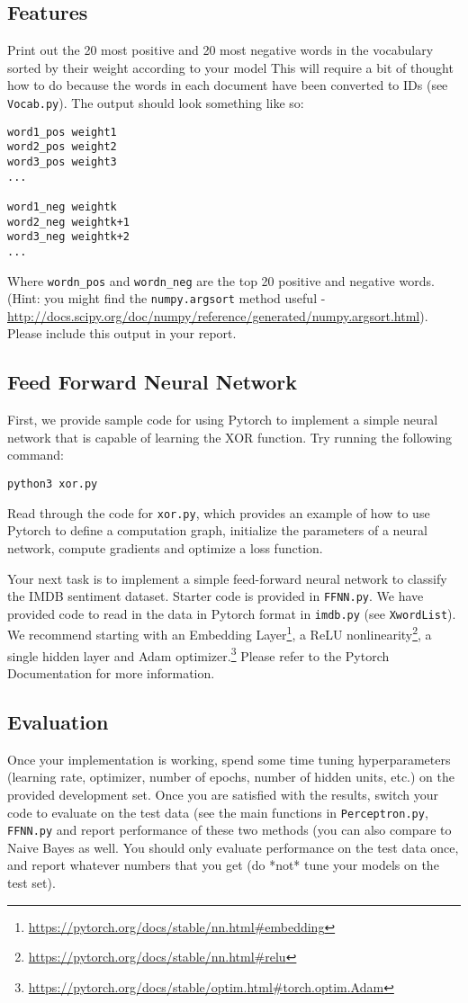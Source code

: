 \documentclass[12pt, letterpaper]{article}
\begin{document}
\subsection*{Features}
Print out the 20 most positive and 20 most negative words in
the vocabulary sorted by their weight according to your model
This will require a bit of thought how to do because the words in each document 
have been converted to IDs (see {\tt Vocab.py}).  The output should look something like so:
\begin{verbatim}
word1_pos weight1
word2_pos weight2
word3_pos weight3
...

word1_neg weightk
word2_neg weightk+1
word3_neg weightk+2
...
\end{verbatim}
Where {\tt wordn\_pos} and {\tt wordn\_neg} are the top 20 positive and negative words.  (Hint: you might find the {\tt numpy.argsort} method
useful - \url{http://docs.scipy.org/doc/numpy/reference/generated/numpy.argsort.html}).  Please include this output in your report.

\subsection*{Feed Forward Neural Network}
First, we provide sample code for using Pytorch to implement a simple neural network that is capable of learning the XOR function.  Try running the following command:
\begin{Verbatim}[xleftmargin=.5in]
python3 xor.py
\end{Verbatim}
Read through the code for {\tt xor.py}, which provides an example of how to use Pytorch to define a computation graph, initialize the parameters of a neural network, compute gradients and optimize a loss function.

Your next task is to implement a simple feed-forward neural network to classify the IMDB sentiment dataset.  Starter code is provided in {\tt FFNN.py}.  We have provided code to read in the data in Pytorch format in {\tt imdb.py} (see {\tt XwordList}).
We recommend starting with an Embedding Layer\footnote{\url{https://pytorch.org/docs/stable/nn.html\#embedding}}, a ReLU nonlinearity\footnote{\url{https://pytorch.org/docs/stable/nn.html\#relu}}, a single hidden layer and Adam optimizer.\footnote{\url{https://pytorch.org/docs/stable/optim.html\#torch.optim.Adam}}
Please refer to the Pytorch Documentation for more information.

\vspace{-.1in}
\subsection*{Evaluation}
Once your implementation is working, spend some time tuning hyperparameters (learning rate, optimizer, number of epochs, number of hidden units, etc.) on the provided development set.
Once you are satisfied with the results, switch your code to evaluate on the test data (see the main functions in {\tt Perceptron.py}, {\tt FFNN.py} and report performance of these two methods (you can also compare to Naive Bayes as well.  You should only evaluate performance on the test data once, and report whatever numbers that you get (do *not* tune your models on the test set).
\end{document}
